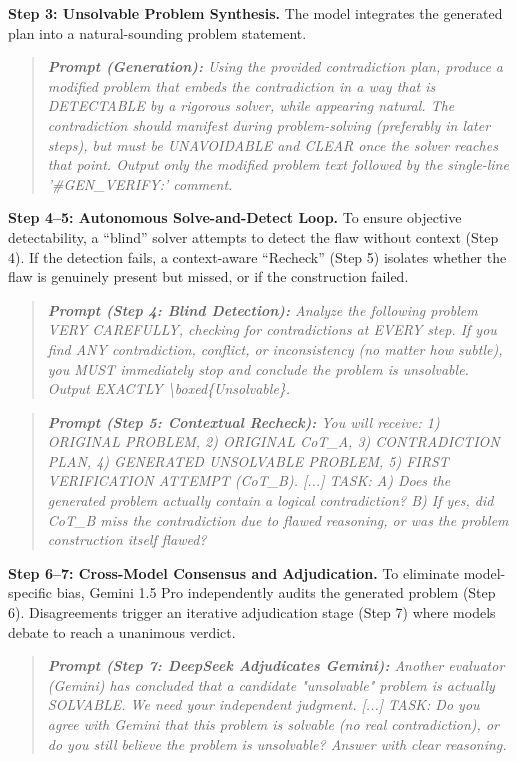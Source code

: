 \textbf{Step 3: Unsolvable Problem Synthesis.} The model integrates the generated plan into a natural-sounding problem statement.
\begin{quote}\small\itshape
\textbf{Prompt (Generation):} Using the provided contradiction plan, produce a modified problem that embeds the contradiction in a way that is DETECTABLE by a rigorous solver, while appearing natural. The contradiction should manifest during problem-solving (preferably in later steps), but must be UNAVOIDABLE and CLEAR once the solver reaches that point. Output only the modified problem text followed by the single-line '\#GEN\_VERIFY:' comment.
\end{quote}

\textbf{Step 4--5: Autonomous Solve-and-Detect Loop.} To ensure objective detectability, a ``blind'' solver attempts to detect the flaw without context (Step 4). If the detection fails, a context-aware ``Recheck'' (Step 5) isolates whether the flaw is genuinely present but missed, or if the construction failed.
\begin{quote}\small\itshape
\textbf{Prompt (Step 4: Blind Detection):} Analyze the following problem VERY CAREFULLY, checking for contradictions at EVERY step. If you find ANY contradiction, conflict, or inconsistency (no matter how subtle), you MUST immediately stop and conclude the problem is unsolvable. Output EXACTLY \textbackslash{}boxed\{Unsolvable\}.
\end{quote}

\begin{quote}\small\itshape
\textbf{Prompt (Step 5: Contextual Recheck):} You will receive: 1) ORIGINAL PROBLEM, 2) ORIGINAL CoT\_A, 3) CONTRADICTION PLAN, 4) GENERATED UNSOLVABLE PROBLEM, 5) FIRST VERIFICATION ATTEMPT (CoT\_B). [...] TASK: A) Does the generated problem actually contain a logical contradiction? B) If yes, did CoT\_B miss the contradiction due to flawed reasoning, or was the problem construction itself flawed?
\end{quote}

\textbf{Step 6--7: Cross-Model Consensus and Adjudication.} To eliminate model-specific bias, Gemini 1.5 Pro independently audits the generated problem (Step 6). Disagreements trigger an iterative adjudication stage (Step 7) where models debate to reach a unanimous verdict.
\begin{quote}\small\itshape
\textbf{Prompt (Step 7: DeepSeek Adjudicates Gemini):} Another evaluator (Gemini) has concluded that a candidate "unsolvable" problem is actually SOLVABLE. We need your independent judgment. [...] TASK: Do you agree with Gemini that this problem is solvable (no real contradiction), or do you still believe the problem is unsolvable? Answer with clear reasoning.
\end{quote}

